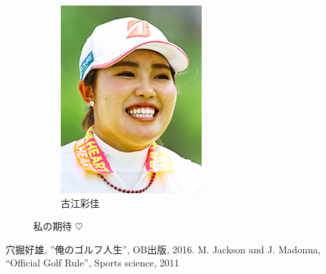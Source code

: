 \documentclass[a4j, twocolumn]{jarticle}
\begin{document}
\begin{figure}[htb]
\begin{subfigure}{0.25\linewidth}
      \includegraphics[width=\linewidth]{furue.jpg}
      \caption{古江彩佳}\label{furue}
    \end{subfigure}
    \caption{私の期待 $\heartsuit$}\label{kitai}
\end{figure}

\vspace{-2em}

\begin{thebibliography}{99}
   穴掘好雄, ''俺のゴルフ人生'', OB出版, 2016.
   M. Jackson and J. Madonna, ``Official Golf Rule'', Sports science, 2011 
\end{thebibliography}
\end{document}
